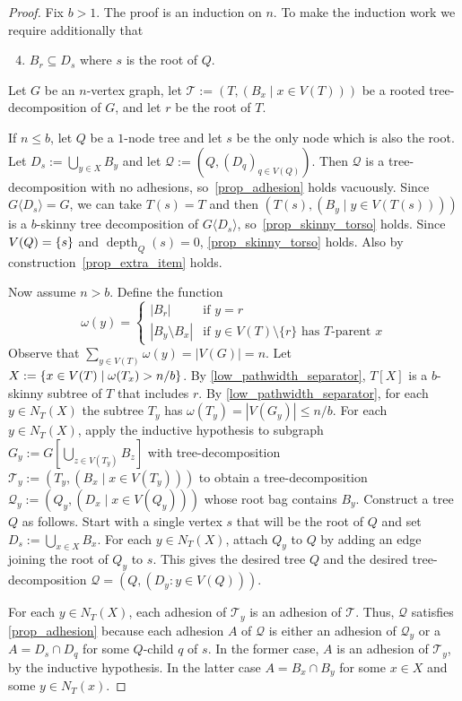 \documentclass{patmorin}
\renewcommand{\le}{\leqslant}
\newcommand{\torso}[2]{{#1}\langle{#2}\rangle}
\DeclareMathOperator{\depth}{depth}
\DeclarePairedDelimiter{\set}{\{}{\}}
\newcommand{\calQ}{\mathcal{Q}}
\newcommand{\calT}{\mathcal{T}}
\begin{document}
  \begin{proof}
    Fix $b>1$.
    The proof is an induction on $n$.
    To make the induction work we require additionally that
    \begin{enumerate}[nosep,nolistsep,label=\rm(\alph*)]
    \setcounter{enumi}{3}
    \item\label{prop_extra_item} $B_r \subseteq D_s$ where $s$ is the root of $Q$.
    \end{enumerate}
    Let $G$ be an $n$-vertex graph, let $\calT:=(T,(B_x\mid x\in V(T)))$ be a rooted tree-decomposition of $G$, and let $r$ be the root of $T$.

If $n\le b$, let $Q$ be a $1$-node tree and let $s$ be the only node which is also the root.
Let $D_s:=\bigcup_{y\in X} B_y$ and let $\calQ:=(Q,(D_q)_{q\in V(Q)})$.
Then $\calQ$ is a tree-decomposition with no adhesions, so~\ref{prop_adhesion} holds vacuously.
Since $\torso{G}{D_s}=G$, we can take $T(s)=T$ and then $(T(s),(B_y\mid y\in V(T(s))))$ is a $b$-skinny tree decomposition of $\torso{G}{D_s}$,
so~\ref{prop_skinny_torso} holds.
Since $V(Q)=\set{s}$ and $\depth_Q(s)=0$, \ref{prop_skinny_torso}  holds.
Also by construction~\ref{prop_extra_item} holds.

    Now assume $n> b$.  Define the function 
    \[
        \omega(y) = \begin{cases}
        |B_r| & \text{if $y=r$} \\
        |B_y\setminus B_x| & \text{if $y\in V(T)\setminus\{r\}$ has $T$-parent $x$}
        \end{cases}
    \]
    Observe that $\sum_{y\in V(T)}\omega(y)=|V(G)|=n$.
    Let $X:=\set{x\in V(T)\mid  \omega(T_x)>n/b}$.
    By \cref{low_pathwidth_separator}, $T[X]$ is a $b$-skinny subtree of $T$ that includes $r$.
    By \cref{low_pathwidth_separator}, for each $y\in N_T(X)$ the subtree $T_y$ has $\omega(T_y)=|V(G_y)|\le n/b$. For each $y\in N_T(X)$, apply the inductive hypothesis to subgraph $G_y:=G[\bigcup_{z\in V(T_y)} B_z]$ with tree-decomposition $\calT_y:=(T_y, (B_x\mid x\in V(T_y)))$ to obtain a tree-decomposition $\calQ_{y}:=(Q_y,(D_x \mid x\in V(Q_y)))$ whose root bag contains $B_y$.
    Construct a tree $Q$ as follows.
    Start with a single vertex $s$ that will be the root of $Q$ and set $D_s:=\bigcup_{x\in X} B_x$.
    For each $y\in N_T(X)$, attach $Q_y$ to $Q$ by adding an edge joining the root of $Q_y$ to $s$.
    This gives the desired tree $Q$ and the desired tree-decomposition $\calQ=(Q,(D_y:y\in V(Q)))$.

    For each $y\in N_T(X)$, each adhesion of $\calT_y$ is an adhesion of $\calT$.
    Thus, $\calQ$ satisfies \ref{prop_adhesion} because each adhesion $A$ of $\calQ$ is either an adhesion of $\calQ_y$ or a $A=D_s\cap D_{q}$ for some $Q$-child $q$ of $s$.  In the former case, $A$ is an adhesion of $\calT_y$, by the inductive hypothesis. In the latter case $A=B_x\cap B_y$ for some $x\in X$ and some $y\in N_T(x)$.




\end{proof}
\end{document}
